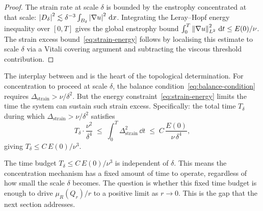 \begin{proof}
  The strain rate at scale $\delta$ is bounded by the enstrophy concentrated at
  that scale: $\left\lvert D_\delta \right\rvert^2 \lesssim \delta^{-3}\int_{B_\delta}\left\lvert \nabla u \right\rvert^2\,\mathrm{d} x$.
  Integrating the Leray--Hopf energy inequality over $[0,T]$ gives the global enstrophy
  bound $\int_0^T\left\lVert \nabla u \right\rVert^2_{L^{2}}\,\mathrm{d} t \leq E(0)/\nu$.  The strain excess
  bound~\eqref{eq:strain-energy} follows by localising this estimate to scale $\delta$
  via a Vitali covering argument and subtracting the viscous threshold contribution.
\end{proof}

The interplay between  and  is the
heart of the topological determination.  For concentration to proceed at scale $\delta$,
the balance condition~\eqref{eq:balance-condition} requires
$\Delta_{\mathrm{strain}} > \nu/\delta^2$.
But the energy constraint~\eqref{eq:strain-energy} limits the time the system can sustain
such strain excess.  Specifically: the total time $T_\delta$ during which
$\Delta_{\mathrm{strain}} > \nu/\delta^2$ satisfies
\begin{equation}\label{eq:time-budget}
  T_\delta \cdot \frac{\nu^2}{\delta^4}
  \;\leq\; \int_0^T \Delta_{\mathrm{strain}}^2\,\dd t
  \;\leq\; C\,\frac{E(0)}{\nu\,\delta^4},
\end{equation}
giving $T_\delta \leq C\,E(0)/\nu^3$.

\begin{remark}\label{rem:time-budget}
  The time budget $T_\delta \leq C\,E(0)/\nu^3$ is independent of $\delta$.
  This means the concentration mechanism has a fixed amount of time to operate,
  regardless of how small the scale $\delta$ becomes.  The question is whether this
  fixed time budget is enough to drive $\mu_R(Q_r)/r$ to a positive limit as
  $r \to 0$.  This is the gap that the next section addresses.
\end{remark}
